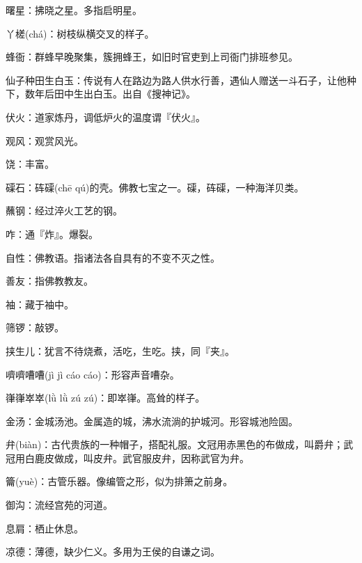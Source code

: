 \startbuffer[1053]
曙星：拂晓之星。多指启明星。
\stopbuffer


\startbuffer[1054]
丫槎(chá)：树枝纵横交叉的样子。
\stopbuffer


\startbuffer[1055]
蜂衙：群蜂早晚聚集，簇拥蜂王，如旧时官吏到上司衙门排班参见。
\stopbuffer


\startbuffer[1056]
仙子种田生白玉：传说有人在路边为路人供水行善，遇仙人赠送一斗石子，让他种下，数年后田中生出白玉。出自《搜神记》。
\stopbuffer


\startbuffer[1057]
伏火：道家炼丹，调低炉火的温度谓『伏火』。
\stopbuffer


\startbuffer[1058]
观风：观赏风光。
\stopbuffer


\startbuffer[1059]
饶：丰富。
\stopbuffer


\startbuffer[1060]
磲石：砗磲(chē qú)的壳。佛教七宝之一。磲，砗磲，一种海洋贝类。
\stopbuffer


\startbuffer[1061]
蘸钢：经过淬火工艺的钢。
\stopbuffer


\startbuffer[1062]
咋：通『炸』。爆裂。
\stopbuffer


\startbuffer[1063]
自性：佛教语。指诸法各自具有的不变不灭之性。
\stopbuffer


\startbuffer[1064]
善友：指佛教教友。
\stopbuffer


\startbuffer[1065]
袖：藏于袖中。
\stopbuffer


\startbuffer[1066]
筛锣：敲锣。
\stopbuffer


\startbuffer[1067]
挟生儿：犹言不待烧煮，活吃，生吃。挟，同『夹』。
\stopbuffer


\startbuffer[1068]
嚌嚌嘈嘈(jì jì cáo cáo)：形容声音嘈杂。
\stopbuffer


\startbuffer[1069]
嵂嵂崒崒(lǜ lǜ zú zú)：即崒嵂。高耸的样子。
\stopbuffer


\startbuffer[1070]
金汤：金城汤池。金属造的城，沸水流淌的护城河。形容城池险固。
\stopbuffer


\startbuffer[1071]
弁(biàn)：古代贵族的一种帽子，搭配礼服。文冠用赤黑色的布做成，叫爵弁；武冠用白鹿皮做成，叫皮弁。武官服皮弁，因称武官为弁。
\stopbuffer


\startbuffer[1072]
籥(yuè)：古管乐器。像编管之形，似为排箫之前身。
\stopbuffer


\startbuffer[1073]
御沟：流经宫苑的河道。
\stopbuffer


\startbuffer[1074]
息肩：栖止休息。
\stopbuffer


\startbuffer[1075]
凉德：薄德，缺少仁义。多用为王侯的自谦之词。
\stopbuffer


